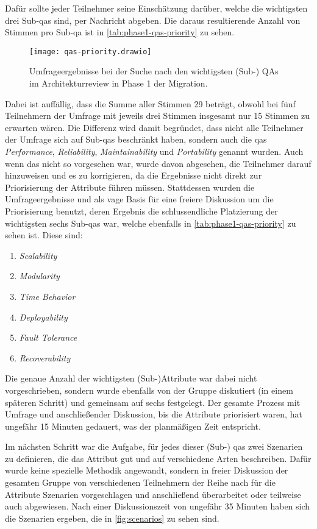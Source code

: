 Dafür sollte jeder Teilnehmer seine Einschätzung darüber, welche die wichtigsten drei Sub-\glspl{qa} sind, per Nachricht abgeben.
Die daraus resultierende Anzahl von Stimmen pro Sub-\gls{qa} ist in \cref{tab:phase1-qas-priority} zu sehen. 

\begin{figure}
	\centering
	\texttt{[image: qas-priority.drawio]}
	\caption[Umfrageergebnisse wichtigste (Sub-) QAs im Architekturreview]{
		Umfrageergebnisse bei der Suche nach den wichtigsten (Sub-) QAs im Architekturreview in Phase 1 der Migration.
	}
	\label{fig:qas-priority}
\end{figure}
Dabei ist auffällig, dass die Summe aller Stimmen 29 beträgt, obwohl bei fünf Teilnehmern der Umfrage mit jeweils drei Stimmen insgesamt nur 15 Stimmen zu erwarten wären.
Die Differenz wird damit begründet, dass nicht alle Teilnehmer der Umfrage sich auf Sub-\glspl{qa} beschränkt haben, sondern auch die \glspl{qa} \emph{Performance}, \emph{Reliability}, \emph{Maintainability} und \emph{Portability} genannt wurden.
Auch wenn das nicht so vorgesehen war, wurde davon abgesehen, die Teilnehmer darauf hinzuweisen und es zu korrigieren, da die Ergebnisse nicht direkt zur Priorisierung der Attribute führen müssen.
Stattdessen wurden die Umfrageergebnisse und als vage Basis für eine freiere Diskussion um die Priorisierung benutzt, deren Ergebnis die schlussendliche Platzierung der wichtigsten sechs Sub-\glspl{qa} war, welche ebenfalls in \cref{tab:phase1-qas-priority} zu sehen ist.
Diese sind:
\begin{enumerate}
	\item \emph{Scalability}
	\item \emph{Modularity}
	\item \emph{Time Behavior}
	\item \emph{Deployability}
	\item \emph{Fault Tolerance}
	\item \emph{Recoverability}
\end{enumerate}
Die genaue Anzahl der wichtigsten (Sub-)Attribute war dabei nicht vorgeschrieben, sondern wurde ebenfalls von der Gruppe diskutiert (in einem späteren Schritt) und gemeinsam auf sechs festgelegt.
Der gesamte Prozess mit Umfrage und anschließender Diskussion, bis die Attribute priorisiert waren, hat ungefähr 15 Minuten gedauert, was der planmäßigen Zeit entspricht.

Im nächsten Schritt war die Aufgabe, für jedes dieser (Sub-) \glspl{qa} zwei Szenarien zu definieren, die das Attribut gut und auf verschiedene Arten beschreiben.
Dafür wurde keine spezielle Methodik angewandt, sondern in freier Diskussion der gesamten Gruppe von verschiedenen Teilnehmern der Reihe nach für die Attribute Szenarien vorgeschlagen und anschließend überarbeitet oder teilweise auch abgewiesen.
Nach einer Diskussionszeit von ungefähr 35 Minuten haben sich die Szenarien ergeben, die in  \cref{fig:scenarios} zu sehen sind. 

